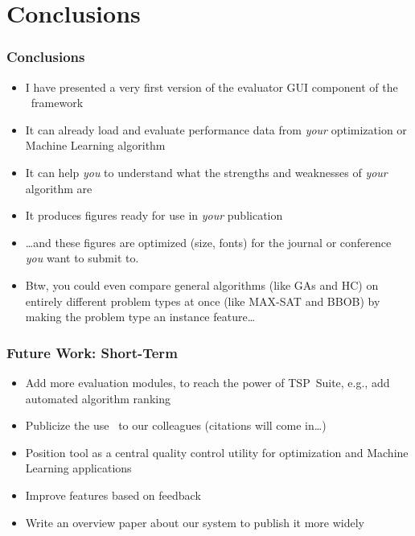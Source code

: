 %
\section{Conclusions}%
%
\begin{frame}%
\frametitle{Conclusions}%
\begin{itemize}%
\item I have presented a very first version of the evaluator GUI component of the \optimizationBenchmarking\ framework%
\item<2-> It can already load and evaluate performance data from \emph{your} optimization or Machine Learning algorithm%
\item<3-> It can help \emph{you} to understand what the strengths and weaknesses of \emph{your} algorithm are%
\item<4-> It produces figures ready for use in \emph{your} publication%
\item<5-> {\dots}and these figures are optimized (size, fonts) for the journal or conference \emph{you} want to submit to.%
\item<6-> Btw, you could even compare general algorithms (like GAs and HC) on entirely different problem types at once (like MAX-SAT and BBOB) by making the problem type an instance feature\dots%
\end{itemize}%
\end{frame}
%
%
\begin{frame}%
\frametitle{Future Work: Short-Term}%
\begin{itemize}%
\item Add more evaluation modules, to reach the power of TSP~Suite, e.g., add automated algorithm ranking%
\item<2-> Publicize the use \optimizationBenchmarking\ to our colleagues (citations will come in\dots)%
\item<3-> Position tool as a central quality control utility for optimization and Machine Learning applications%
\item<4-> Improve features based on feedback%
\item<5-> Write an overview paper about our system to publish it more widely%
\end{itemize}%
\end{frame}
%
